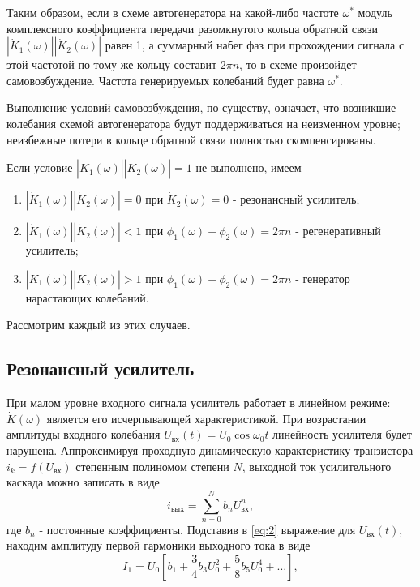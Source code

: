 Таким образом, если в схеме автогенератора на какой-либо частоте $\omega^*$ модуль комплексного коэффициента передачи разомкнутого кольца обратной связи $|\dot{K}_1(\omega)||\dot{K}_2(\omega)|$ равен 1, а суммарный набег фаз при прохождении сигнала с этой частотой по тому же кольцу составит $2\pi n$, то в схеме произойдет самовозбуждение. Частота генерируемых колебаний будет равна $\omega^*$.

Выполнение условий самовозбуждения, по существу, означает, что возникшие колебания схемой автогенератора будут поддерживаться на неизменном уровне; неизбежные потери в кольце обратной связи полностью скомпенсированы.

Если условие $|\dot{K}_1(\omega)||\dot{K}_2(\omega)|=1$ не выполнено, имеем
\begin{enumerate}
\item {
	$|\dot{K}_1(\omega)||\dot{K}_2(\omega)|=0$ при $\dot{K}_2(\omega)=0$ - резонансный усилитель;
}
\item {
	$|\dot{K}_1(\omega)||\dot{K}_2(\omega)|<1$ при $\phi_1(\omega)+\phi_2(\omega)=2\pi n$ - регенеративный усилитель;
}
\item {
	$|\dot{K}_1(\omega)||\dot{K}_2(\omega)|>1$ при $\phi_1(\omega)+\phi_2(\omega)=2\pi n$ - генератор нарастающих колебаний.
}
\end{enumerate}
Рассмотрим каждый из этих случаев.

\subsection{Резонансный усилитель}
При малом уровне входного сигнала усилитель работает в линейном режиме: $\dot{K}(\omega)$ является его исчерпывающей характеристикой.
При возрастании амплитуды входного колебания $U_\text{вх}(t)=U_0\cos \omega_0 t$ линейность усилителя будет нарушена. Аппроксимируя проходную динамическую характеристику транзистора $i_k=f(U_\text{вх})$ степенным полиномом степени $N$, выходной ток усилительного каскада можно записать в виде
\begin{equation}
i_\text{вых}=\sum\limits_{n=0}^{N}b_n U^n_\text{вх},
\label{eq:2}
\end{equation}
где $b_n$ - постоянные коэффициенты.
Подставив в \eqref{eq:2} выражение для $U_\text{вх}(t)$, находим амплитуду первой гармоники выходного тока в виде
\begin{equation}
I_1=U_0[b_1+\frac{3}{4}b_3U_0^2+\frac{5}{8}b_5U_0^4+\ldots],
\label{eq:3}
\end{equation}

